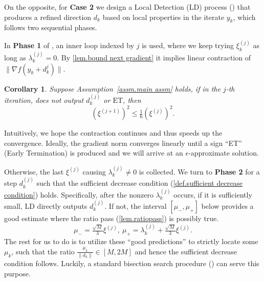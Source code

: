\documentclass{article}
\theoremstyle{plain}
\newtheorem{corollary}[theorem]{Corollary}
\theoremstyle{definition}
\theoremstyle{remark}
\begin{document}
On the opposite, for \textbf{Case 2} we design a Local Detection (LD) process () that produces a refined direction $d_k$ based on local properties in the iterate $y_k$, which follows two sequential phases.

In \textbf{Phase 1} of , an inner loop indexed by $j$ is used, where we keep trying $\xi^{(j)}_k$ as long as $\lambda_k^{(j)}=0$.
By \cref{lem.bound next gradient} it implies linear contraction of $\|\nabla f(y_k+d_k^j)\|$.
\begin{corollary}
    \label{coro.inner loop bound next gradient}
    Suppose Assumption~\ref{assm.main assm} holds, if in the $j$-th iteration,  does not output $d_k^{(j)}$ or $\textrm{ET}$, then
    \begin{equation}
        \label{eq.inner loop bound next gradient}
        (\xi^{(j+1)})^2 \leq \tfrac{1}{6}(\xi^{(j)})^2.
    \end{equation}
\end{corollary}
Intuitively, we hope the contraction continues and thus speeds up the convergence. Ideally, the gradient norm converges linearly until a sign ``ET'' (Early Termination) is produced and we will arrive at an $\epsilon$-approximate solution.

Otherwise, the last $\xi^{(j)}$ causing $\lambda_k^{(j)} \neq 0$ is collected. We turn to \textbf{Phase 2} for a step $d_k^{(j)}$ such that the sufficient decrease condition (\cref{def.sufficient decrease condition}) holds. Specifically, after the nonzero $\lambda_k^{(j)}$ occurs, if it is sufficiently small, LD directly outputs $d_k^{(j)}$. If not, the interval $[\mu_-,\mu_+]$ below provides a good estimate where the ratio pass (\cref{lem.ratiopass}) is possibly true.
\begin{equation*}
    \mu_- = \tfrac
    {\sqrt{M}}{3}\xi^{(j)}, \ \mu_+= \lambda_k^{(j)} + \tfrac{\sqrt{M}}{3}\xi^{(j)}.
\end{equation*}
The rest for us to do is to utilize these ``good predictions'' to strictly locate some $\mu_k$, such that the ratio $\tfrac{\mu_k}{\|d_k\|}\in[M, 2M]$ and hence the sufficient decrease condition follows. Luckily, a standard bisection search procedure () can serve this purpose.

\begin{algorithm}[!ht]
    \caption{Bisection for ATR (BS)}\label{alg.bisection}
    \begin{algorithmic}[1]
        \STATE{$\mu_-=\mu$}
        \STATE{$\mu_+ = \mu$}
        \ELSE
        \ENDIF
        \ENDWHILE
    \end{algorithmic}
\end{algorithm}
\end{document}
